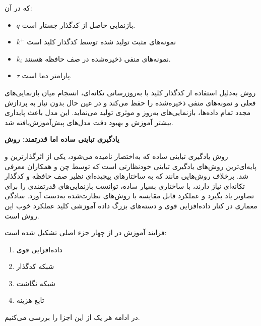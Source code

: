 که در آن:
\begin{itemize}
    \item $q$ بازنمایی حاصل از کدگذار جستار است.
    \item $k^+$ نمونه‌های مثبت تولید شده توسط کدگذار کلید است
    \item $k_i$ نمونه‌های منفی ذخیره‌شده در صف حافظه هستند.
    \item $\tau$ پارامتر دما است.
\end{itemize}
روش 
به‌دلیل استفاده از کدگذار کلید با به‌روزرسانی تکانه‌ای، انسجام میان بازنمایی‌های فعلی و نمونه‌های منفی ذخیره‌شده را حفظ می‌کند و در عین حال بدون نیاز به پردازش مجدد تمام داده‌ها، بازنمایی‌های به‌روز و موثری تولید می‌نماید. این مدل باعث پایداری بیشتر آموزش و بهبود دقت مدل‌های پیش‌آموزش‌یافته شد.\newline

\noindent\textbf{یادگیری تباینی ساده اما قدرتمند: روش }\label{sec:simclr}

روش یادگیری تباینی ساده که به‌اختصار
نامیده می‌شود، یکی از اثرگذارترین و پایه‌ای‌ترین روش‌های یادگیری تباینی خودنظارتی است که توسط
چن و همکاران\cite{chen2020simple}
معرفی شد. برخلاف روش‌هایی مانند
که به ساختارهای پیچیده‌ای نظیر صف حافظه و کدگذار تکانه‌ای نیاز دارند،
با ساختاری بسیار ساده، توانست بازنمایی‌های قدرتمندی را برای تصاویر یاد بگیرد و عملکرد قابل مقایسه با روش‌های نظارت‌شده به‌دست آورد. سادگی معماری در کنار داده‌افزایی قوی و دسته‌های بزرگ داده آموزشی کلید عملکرد خوب این روش است.

فرایند آموزش در 
از چهار جزء اصلی تشکیل شده است:
\begin{enumerate}
    \item داده‌افزایی قوی
    \item شبکه کدگذار
    \item شبکه نگاشت
    \item تابع هزینه 
\end{enumerate}

در ادامه هر یک از این اجزا را بررسی می‌کنیم.

